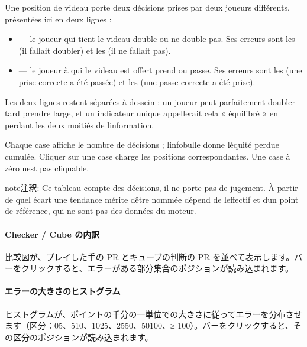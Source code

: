 \documentclass[letterpaper,10pt,dvipdfmx]{sphinxmanual}
\begin{document}
\sphinxAtStartPar
Une position de videau porte deux décisions prises par deux joueurs
différents, présentées ici en deux lignes :
\begin{itemize}
\item {} 
\sphinxAtStartPar
{} — le joueur qui tient le videau double ou ne double pas. Ses
erreurs sont les  (il fallait doubler) et les  (il ne fallait pas).

\item {} 
\sphinxAtStartPar
{} — le joueur à qui le videau est offert prend ou passe. Ses
erreurs sont les  (une prise correcte a été passée) et les
 (une passe correcte a été prise).

\end{itemize}

\sphinxAtStartPar
Les deux lignes restent séparées à dessein : un joueur peut parfaitement
doubler tard  prendre large, et un indicateur unique appellerait cela
« équilibré » en perdant les deux moitiés de l\textquotesingle{}information.

\sphinxAtStartPar
Chaque case affiche le nombre de décisions ; l\textquotesingle{}infobulle donne l\textquotesingle{}équité perdue
cumulée. Cliquer sur une case charge les positions correspondantes. Une case à
zéro n\textquotesingle{}est pas cliquable.

\begin{sphinxadmonition}{note}{注釈:}
\sphinxAtStartPar
Ce tableau compte des décisions, il ne porte pas de jugement. À partir de
quel écart une tendance mérite d\textquotesingle{}être nommée dépend de l\textquotesingle{}effectif et d\textquotesingle{}un
point de référence, qui ne sont pas des données du moteur.
\end{sphinxadmonition}


\paragraph{Checker / Cube の内訳}
\label{\detokenize{manuel:repartition-checker-cube}}
\sphinxAtStartPar
比較図が、プレイした手の PR とキューブの判断の PR を並べて表示します。バーをクリックすると、エラーがある部分集合のポジションが読み込まれます。


\paragraph{エラーの大きさのヒストグラム}
\label{\detokenize{manuel:histogramme-des-magnitudes-d-erreur}}
\sphinxAtStartPar
ヒストグラムが、ポイントの千分の一単位での大きさに従ってエラーを分布させます（区分：0\textendash{}5、5\textendash{}10、10\textendash{}25、25\textendash{}50、50\textendash{}100、≥ 100）。バーをクリックすると、その区分のポジションが読み込まれます。
\end{document}
